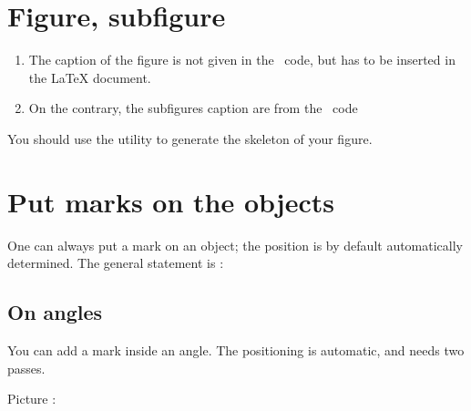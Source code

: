 \section{Figure, subfigure}

\begin{enumerate}
    \item
        The caption of the figure is not given in the \phystricks\ code, but has to be inserted in the LaTeX document.
    \item 
        On the contrary, the subfigures caption are from the \phystricks\ code
\end{enumerate}
You should use the utility  to generate the skeleton of your figure.

\section{Put marks on the objects}

One can always put a mark on an object; the position is by default automatically determined. The general statement is :



\subsection{On angles}

You can add a mark inside an angle. The positioning is automatic, and needs two passes.

\begin{example}

    

Picture : 
\begin{center}
   
\end{center}

\end{example}


